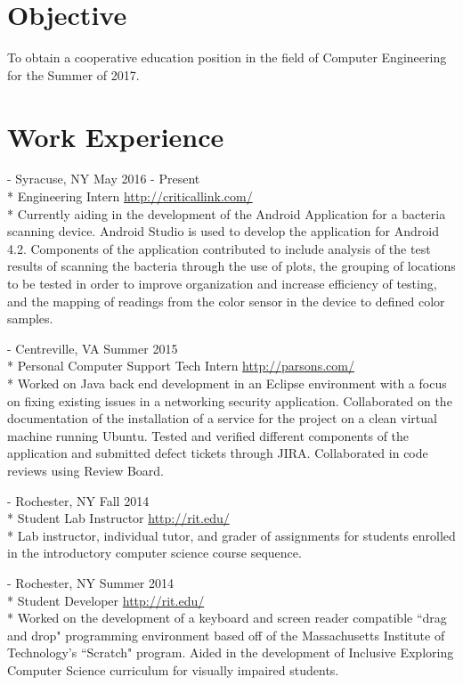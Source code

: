 \documentclass[a4paper,margin,line]{resume}
\newcommand{\rurl}[1]{\hfill {\footnotesize \url{#1}}}
\newcommand{\rdate}[1]{\hfill {\small #1}}
\renewcommand{\employer}[5]{ \item[#1] - #2 \rdate{#3} \\* #4 \rurl{#5} \\*}
\begin{document}
\begin{resume}
\section{\mysidestyle Objective}
    To obtain a cooperative education position in the field of Computer Engineering for the Summer of 2017.
\section{\mysidestyle Work Experience}
	\begin{asparadesc}
        \employer{Critical Link LLC}{Syracuse, NY}{May 2016 - Present}{Engineering Intern}
        {http://criticallink.com/}
        \small
        Currently aiding in the development of the Android Application for a bacteria scanning device. 
        Android Studio is used to develop the application for Android 4.2.  Components of the application 
        contributed to include analysis of the test results of scanning the bacteria through the use 
        of plots, the grouping of locations to be tested in order to improve organization and increase 
        efficiency of testing, and the mapping of readings from the color sensor in the device to defined 
        color samples.
        \normalsize
        \\
        \employer{Parsons Government Services}{Centreville, VA}{Summer 2015}{Personal Computer Support Tech Intern}
        {http://parsons.com/}
        \small
        Worked on Java back end development in an Eclipse environment with a focus on fixing existing 
        issues in a networking security application. Collaborated on the documentation of the installation 
        of a service for the project on a clean virtual machine running Ubuntu. Tested and verified 
        different components of the application and submitted defect tickets through JIRA.  Collaborated 
        in code reviews using Review Board.
        \normalsize
        \\
        \employer{Rochester Institute of Technology}{Rochester, NY}{Fall 2014}{Student Lab Instructor}
        {http://rit.edu/}
        \small
        Lab instructor, individual tutor, and grader of assignments for students enrolled in the 
        introductory computer science course sequence.
        \normalsize
        \\
        \employer{Rochester Institute of Technology}{Rochester, NY}{Summer 2014}{Student Developer}
        {http://rit.edu/}
        \small
        Worked on the development of a keyboard and screen reader compatible ``drag and drop" programming 
        environment based off of the Massachusetts Institute of Technology's ``Scratch" program.  Aided 
        in the development of Inclusive Exploring Computer Science curriculum for visually impaired students.
        \normalsize
        \\
    \end{asparadesc}


\end{resume}
\end{document}
